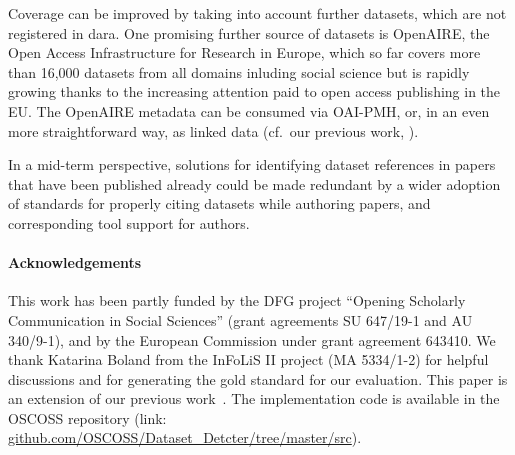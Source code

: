 \documentclass{IOS-Book-Article}
\newcommand{\dara}{\textsf{da\textbar ra}}
\begin{document}
Coverage can be improved by 
taking into account further datasets, which are not registered in {\dara}.
One promising further source of datasets is OpenAIRE, the Open Access Infrastructure for Research in Europe, which so far covers more than 16,000 datasets from all domains inluding social science but is rapidly growing thanks to the increasing attention paid to open access publishing in the EU.
The OpenAIRE metadata can be consumed via OAI-PMH, or, in an even more straightforward way, as linked data (cf.\ our previous work, \citet{VahdatiEtAl:MappingResearchMetadata15}).



In a mid-term perspective, solutions for identifying dataset references in papers that have been published already could be made redundant by a wider adoption of standards for properly citing datasets while authoring papers, and corresponding tool support for authors.

\paragraph{Acknowledgements}
This work has been partly funded by the DFG project “Opening Scholarly Communication in Social Sciences” 
(grant agreements SU 647/19-1 and AU 340/9-1), and by the European Commission under grant agreement 643410. 
We thank Katarina Boland from the InFoLiS II project (MA 5334/1-2) for helpful discussions and for generating the gold standard for our evaluation. 
This paper is an extension of our previous work~\cite{ghavimi2016identifying}.
The implementation code is available in the OSCOSS repository (link: \url{github.com/OSCOSS/Dataset_Detcter/tree/master/src}). 


\end{document}

